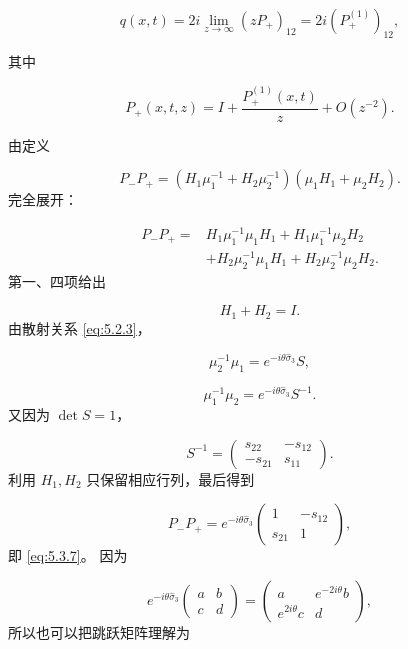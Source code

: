 \documentclass[
    lang=cn,
    scheme=chinese,
    mode=simple,
    device=normal,
    color=blue,
    math=cm,
    thmcnt=section,
    12pt
]{elegantbook}
\begin{document}
\begin{equation}
    q(x,t)
    =
    2i\lim\limits_{z\to\infty}(zP_+)_{12}
    =
    2i(P_+^{(1)})_{12},
    \tag{5.3.8}
    \label{eq:5.3.8}
\end{equation}

其中

\begin{equation}
    P_+(x,t,z)
    =
    I+\dfrac{P_+^{(1)}(x,t)}{z}
    +O(z^{-2}).
    \tag{5.3.9}
    \label{eq:5.3.9}
\end{equation}

\begin{callout}
    由定义

    \[
        P_-P_+
        =
        (H_1\mu_1^{-1}+H_2\mu_2^{-1})
        (\mu_1H_1+\mu_2H_2).
    \]
    完全展开：

    \[
        \begin{aligned}
            P_-P_+
            ={} &
            H_1\mu_1^{-1}\mu_1H_1
            +
            H_1\mu_1^{-1}\mu_2H_2 \\
                & +
            H_2\mu_2^{-1}\mu_1H_1
            +
            H_2\mu_2^{-1}\mu_2H_2.
        \end{aligned}
    \]
    第一、四项给出

    \[
        H_1+H_2=I.
    \]
    由散射关系 \eqref{eq:5.2.3}，

    \[
        \mu_2^{-1}\mu_1
        =
        e^{-i\theta\widehat{\sigma}_3}S,
    \]

    \[
        \mu_1^{-1}\mu_2
        =
        e^{-i\theta\widehat{\sigma}_3}S^{-1}.
    \]
    又因为 $\det S=1$，

    \[
        S^{-1}
        =
        \begin{pmatrix}
            s_{22}  & -s_{12} \\
            -s_{21} & s_{11}
        \end{pmatrix}.
    \]
    利用 $H_1,H_2$ 只保留相应行列，最后得到

    \[
        P_-P_+
        =
        e^{-i\theta\widehat{\sigma}_3}
        \begin{pmatrix}
            1      & -s_{12} \\
            s_{21} & 1
        \end{pmatrix},
    \]
    即 \eqref{eq:5.3.7}。
    因为

    \[
        e^{-i\theta\widehat{\sigma}_3}
        \begin{pmatrix}
            a & b \\c&d
        \end{pmatrix}
        =
        \begin{pmatrix}
            a             & e^{-2i\theta}b \\
            e^{2i\theta}c & d
        \end{pmatrix},
    \]
    所以也可以把跳跃矩阵理解为


\end{callout}
\end{document}

